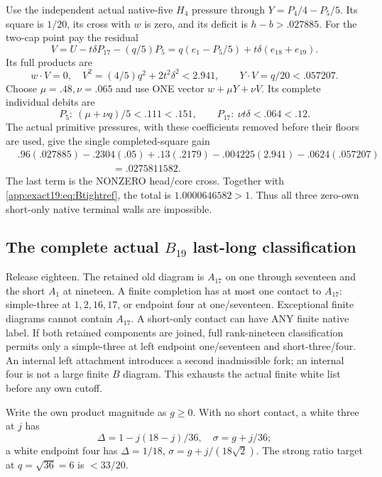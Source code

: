 \documentclass[11pt]{article}
\theoremstyle{definition}
\theoremstyle{remark}
\begin{document}
Use the independent actual native-five
\(H_4\) pressure through
\(Y=P_4/4-P_5/5\).
Its square is \(1/20\), its cross
with \(w\) is zero, and its deficit
is \(h-b>.027885\).
For the two-cap point pay the
residual
\[
 V=U-t\delta P_{17}-(q/5)P_5
        =q(e_1-P_5/5)+t\delta(e_{18}+e_{19}).
\]
Its full products are
\[
 w\cdot V=0,\quad
 V^2=(4/5)q^2+2t^2\delta^2<2.941,\qquad
                         Y\cdot V=q/20<.057207 .
\]
Choose \(\mu=.48,\nu=.065\)
and use ONE vector \(w+\mu Y+\nu V\).
Its complete individual debits are
\[
        P_5:\ (\mu+\nu q)/5<.111<.151,\qquad
        P_{17}:\ \nu t\delta<.064<.12 .
\]
The actual primitive pressures,
with these coefficients removed
before their floors are used,
give the single completed-square
gain
\[
\begin{split}
 &.96(.027885)-.2304(.05)
  +.13(.2179)-.004225(2.941)-.0624(.057207)\\
 &\hspace{4cm}=.0275811582 .
\end{split}
\]
The last term is the NONZERO
head/core cross.
Together with
\eqref{app:exact19:eq:Btightref},
the total is \(1.0000646582>1\).
Thus all three zero-own short-only
native terminal walls are impossible.


\subsection[The complete actual B19 last-long classification]{The complete actual \(B_{19}\) last-long classification}
\label{app:exact19:Blastlong}

Release eighteen.
The retained old diagram is
\(A_{17}\) on one through seventeen
and the short \(A_1\) at nineteen.
A finite completion has at most
one contact to \(A_{17}\):
simple-three at \(1,2,16,17\),
or endpoint four at one/seventeen.
Exceptional finite diagrams cannot
contain \(A_{17}\).
A short-only contact can have ANY
finite native label.
If both retained components are
joined, full rank-nineteen
classification permits only a
simple-three at left endpoint
one/seventeen and short-three/four.
An internal left attachment
introduces a second inadmissible
fork; an internal four is not a
large finite \(B\) diagram.
This exhausts the actual finite
white list before any own cutoff.

Write the own product magnitude
as \(g\ge0\).
With no short contact, a white
three at \(j\) has
\[
 \Delta=1-j(18-j)/36,\quad\sigma=g+j/36;
\]
a white endpoint four has
\(\Delta=1/18\),
\(\sigma=g+j/(18\sqrt2)\).
The strong ratio target at
\(q=\sqrt{36}=6\) is \(<33/20\).
\end{document}

